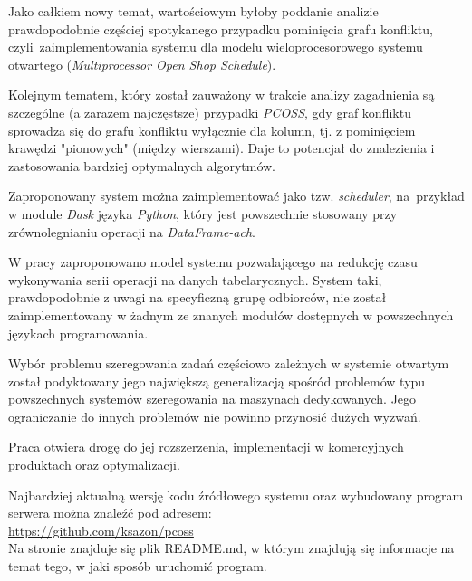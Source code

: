 \documentclass[brudnopis]{xmgr}
\begin{document}
Jako całkiem nowy temat, wartościowym byłoby poddanie analizie prawdopodobnie częściej spotykanego przypadku pominięcia grafu konfliktu, czyli~zaimplementowania systemu dla modelu wieloprocesorowego systemu otwartego (\emph{Multiprocessor Open Shop Schedule}).
\medskip

Kolejnym tematem, który został zauważony w trakcie analizy zagadnienia są szczególne (a zarazem najczęstsze) przypadki \emph{PCOSS}, gdy graf konfliktu sprowadza się do grafu konfliktu wyłącznie dla kolumn, tj. z pominięciem krawędzi "pionowych" (między wierszami). Daje to potencjał do znalezienia i zastosowania bardziej optymalnych algorytmów.
\medskip

Zaproponowany system można zaimplementować jako tzw. \emph{scheduler}, na~przykład w module \emph{Dask} \cite{dask} języka \emph{Python}, który jest powszechnie stosowany przy zrównolegnianiu operacji na \emph{DataFrame-ach}.



\summary

W pracy zaproponowano model systemu pozwalającego na redukcję czasu wykonywania serii operacji na danych tabelarycznych. System taki, prawdopodobnie z uwagi na specyficzną grupę odbiorców, nie został zaimplementowany w żadnym ze znanych modułów dostępnych w powszechnych językach programowania.
\medskip

Wybór problemu szeregowania zadań częściowo zależnych w systemie otwartym został podyktowany jego największą generalizacją spośród problemów typu powszechnych systemów szeregowania na maszynach dedykowanych. Jego ograniczanie do innych problemów nie powinno przynosić dużych wyzwań.
\medskip

Praca otwiera drogę do jej rozszerzenia, implementacji w komercyjnych produktach oraz optymalizacji.
\medskip

Najbardziej aktualną wersję kodu źródłowego systemu oraz wybudowany program serwera można znaleźć pod adresem:\\ \url{https://github.com/ksazon/pcoss}\\
Na stronie znajduje się plik README.md, w którym znajdują się informacje na temat tego, w jaki sposób uruchomić program.





% 
% 


% 
\printbibliography[nottype=online,title={Bibliografia}]
\printbibliography[type=online,title={Źródła internetowe}]
\listoftables

\listoffigures

\oswiadczenie
\end{document}
